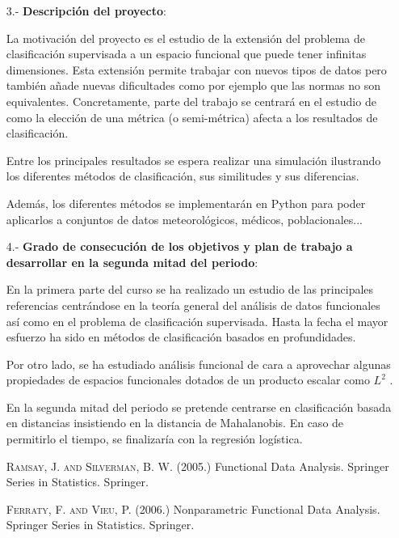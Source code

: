 \documentclass[a4paper,oneside,11pt,leqno]{article}
\begin{document}
\begin{enumerate}
    \item[3.-] {\bf Descripción del proyecto}:

          La motivación del proyecto es el estudio de la extensión del problema de clasificación supervisada a
          un espacio funcional que puede tener infinitas dimensiones. Esta extensión permite trabajar con nuevos tipos de
          datos pero también añade nuevas dificultades como por ejemplo que las normas no son equivalentes. Concretamente,
          parte del trabajo se centrará en el estudio de como la elección de una métrica (o semi-métrica) afecta
          a los resultados de clasificación.

          Entre los principales resultados se espera realizar una simulación ilustrando los diferentes
          métodos de clasificación, sus similitudes y sus diferencias.

          Además, los diferentes métodos se implementarán en Python para poder aplicarlos a conjuntos de datos meteorológicos,
          médicos, poblacionales...

    \item[4.-] {\bf Grado de consecución de los objetivos y plan de trabajo a desarrollar en la segunda mitad del periodo}:

          En la primera parte del curso se ha realizado un estudio de las principales referencias \cite{Ramsay-Silverman, Ferraty-Vieu}
          centrándose en la teoría general del análisis de datos funcionales así como en el problema de clasificación supervisada.
          Hasta la fecha el mayor esfuerzo ha sido en métodos de clasificación basados en profundidades.

          Por otro lado, se ha estudiado análisis funcional de cara a aprovechar algunas propiedades de espacios funcionales dotados
          de un producto escalar como $L^2$ \cite{papa-Rudin}.

          En la segunda mitad del periodo se pretende centrarse en clasificación basada en distancias insistiendo en
          la distancia de Mahalanobis. En caso de permitirlo el tiempo, se finalizaría con la regresión logística.

          \begin{thebibliography}{10}

              \textsc{Ramsay, J. and Silverman, B. W.} (2005.) Functional Data Analysis.
              Springer Series in Statistics. Springer.

              \textsc{Ferraty, F. and Vieu, P.} (2006.) Nonparametric Functional Data Analysis.
              Springer Series in Statistics. Springer.


\end{thebibliography}
\end{enumerate}
\end{document}
